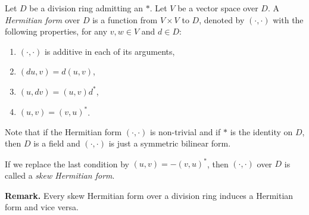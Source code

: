 \documentclass[12pt]{article}
\begin{document}
Let $D$ be a division ring admitting an  $*$.  Let $V$ be a vector space over $D$.  A \emph{Hermitian form} over $D$ is a function from $V\times V$ to $D$, denoted by $(\cdot,\cdot)$ with the following properties, for any $v,w\in V$ and $d\in D$:

\begin{enumerate}
\item $(\cdot,\cdot)$ is additive in each of its arguments,
\item $(du,v)=d(u,v)$,
\item $(u,dv)=(u,v)d^*$,
\item $(u,v)=(v,u)^*$.
\end{enumerate}

Note that if the Hermitian form $(\cdot,\cdot)$ is non-trivial and if $*$ is the identity on $D$, then $D$ is a field and $(\cdot,\cdot)$ is just a symmetric bilinear form.

If we replace the last condition by $(u,v)=-(v,u)^*$, then $(\cdot,\cdot)$ over $D$ is called a \emph{skew Hermitian form}.

\textbf{Remark.}  Every skew Hermitian form over a division ring induces a Hermitian form and vice versa.
\end{document}
